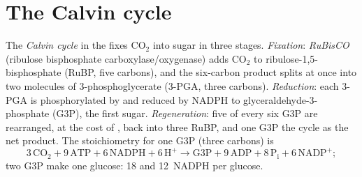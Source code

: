 \section{The Calvin cycle}

\begin{definition}\label{def:b1:photosynthesis:fixation}
The \emph{Calvin cycle} in the  fixes $\mathrm{CO_2}$ into sugar
in three stages. \emph{Fixation}: \emph{RuBisCO} (ribulose
bisphosphate carboxylase/oxygenase) adds $\mathrm{CO_2}$ to
ribulose-1,5-bisphosphate (RuBP, five carbons), and the six-carbon
product splits at once into two molecules of 3-phosphoglycerate
(3-PGA, three carbons). \emph{Reduction}: each 3-PGA is phosphorylated
by  and reduced by NADPH to glyceraldehyde-3-phosphate (G3P), the
first sugar. \emph{Regeneration}: five of every six G3P are rearranged,
at the cost of , back into three RuBP, and one G3P  the cycle
as the net product. The stoichiometry for one G3P (three carbons) is
\[
3\,\mathrm{CO_2} + 9\,\mathrm{ATP} + 6\,\mathrm{NADPH} + 6\,\mathrm{H^+}
\to \text{G3P} + 9\,\mathrm{ADP} + 8\,\mathrm{P_i} + 6\,\mathrm{NADP^+} ;
\]
two G3P make one glucose: \qty{18}{}  and \qty{12}{NADPH} per glucose.
\end{definition}

